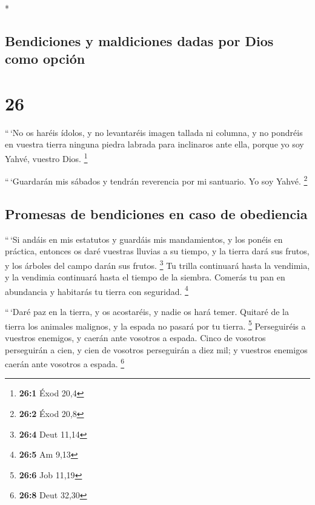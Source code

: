 \begin{paracol}{2}
\begin{otherlanguage}{english}
\end{otherlanguage}

\switchcolumn[0]*

\hypertarget{bendiciones-y-maldiciones-dadas-por-dios-como-opciuxf3n}{%
\subsection{Bendiciones y maldiciones dadas por Dios como
opción}\label{bendiciones-y-maldiciones-dadas-por-dios-como-opciuxf3n}}

\hypertarget{section-50}{%
\section{26}\label{section-50}}

 ``\,`No os haréis ídolos, y no levantaréis imagen tallada
ni columna, y no pondréis en vuestra tierra ninguna piedra labrada para
inclinaros ante ella, porque yo soy Yahvé, vuestro Dios. \footnote{\textbf{26:1}
  Éxod 20,4}

 ``\,`Guardarán mis sábados y tendrán reverencia por mi
santuario. Yo soy Yahvé. \footnote{\textbf{26:2} Éxod 20,8}

\hypertarget{promesas-de-bendiciones-en-caso-de-obediencia}{%
\subsection{Promesas de bendiciones en caso de
obediencia}\label{promesas-de-bendiciones-en-caso-de-obediencia}}

 ``\,`Si andáis en mis estatutos y guardáis mis
mandamientos, y los ponéis en práctica,  entonces os daré
vuestras lluvias a su tiempo, y la tierra dará sus frutos, y los árboles
del campo darán sus frutos. \footnote{\textbf{26:4} Deut 11,14}
 Tu trilla continuará hasta la vendimia, y la vendimia
continuará hasta el tiempo de la siembra. Comerás tu pan en abundancia y
habitarás tu tierra con seguridad. \footnote{\textbf{26:5} Am 9,13}

 ``\,`Daré paz en la tierra, y os acostaréis, y nadie os
hará temer. Quitaré de la tierra los animales malignos, y la espada no
pasará por tu tierra. \footnote{\textbf{26:6} Job 11,19} 
Perseguiréis a vuestros enemigos, y caerán ante vosotros a espada.
 Cinco de vosotros perseguirán a cien, y cien de vosotros
perseguirán a diez mil; y vuestros enemigos caerán ante vosotros a
espada. \footnote{\textbf{26:8} Deut 32,30}


\end{paracol}
